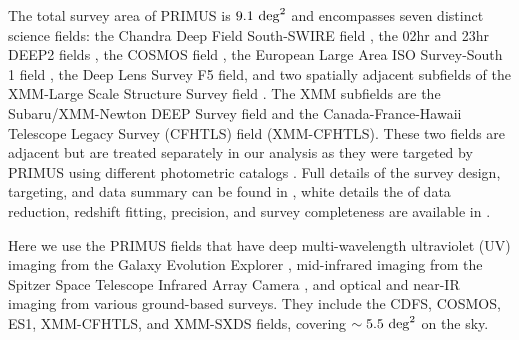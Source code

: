 The total survey area of PRIMUS is $9.1~\degsq$ and encompasses seven distinct science fields:
the Chandra Deep Field South-SWIRE field \citep[CDFS;][]{Lonsdale03},
the 02hr and 23hr DEEP2 fields \citep{Newman13},
the COSMOS field \citep{Scoville07},
the European Large Area ISO Survey-South 1 field \citep[ES1;][]{Oliver00},
the Deep Lens Survey \citep[DLS;][]{Wittman02} F5 field,
and two spatially adjacent subfields of the XMM-Large Scale Structure Survey field \citep[XMM-LSS;][]{Pierre04}.
The XMM subfields are the Subaru/XMM-Newton DEEP Survey field \citep[XMM-SXDS;][]{Furusawa08} and the Canada-France-Hawaii 
Telescope Legacy 
Survey (CFHTLS) field (XMM-CFHTLS).
These two fields are adjacent but are treated separately in our analysis 
as they were targeted by PRIMUS using different photometric catalogs \citep[see][for details]{Coil11}.
Full details of the survey design, targeting, and data summary can be found in \citet{Coil11}, white details the of data reduction, redshift 
fitting, precision, 
and survey completeness are available in \citet{Cool13}.

Here we use the PRIMUS fields that have deep multi-wavelength ultraviolet (UV) imaging from the Galaxy Evolution Explorer 
\citep[GALEX;][]{Martin05}, 
mid-infrared imaging from the Spitzer Space Telescope \citep{Werner04} Infrared Array Camera \citep[IRAC;][]{Fazio04}, and optical and 
near-IR imaging 
from various ground-based surveys.
They include the CDFS, COSMOS, ES1, XMM-CFHTLS, and XMM-SXDS fields, covering $\sim5.5~\degsq$ on the sky.

